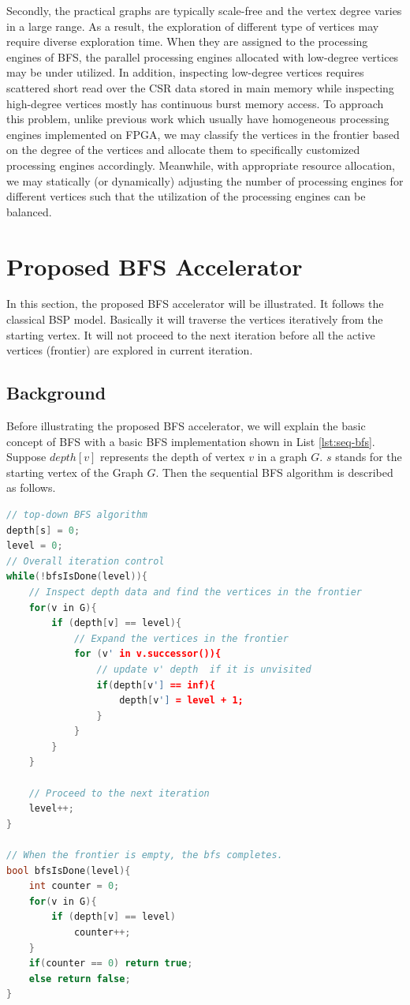 \documentclass[12pt]{article} %
\begin{document}
Secondly, the practical graphs are typically scale-free and the vertex degree 
varies in a large range. As a result, the exploration of different type of vertices 
may require diverse exploration time. When they are assigned to the processing engines of BFS, 
the parallel processing engines allocated with low-degree vertices may be under utilized. 
In addition, inspecting low-degree vertices requires scattered short read over the 
CSR data stored in main memory while inspecting high-degree vertices mostly has continuous 
burst memory access. To approach this problem, unlike previous work which usually 
have homogeneous processing engines implemented on FPGA, we may classify the vertices in 
the frontier based on the degree of the vertices and allocate them to specifically customized 
processing engines accordingly. Meanwhile, with appropriate resource allocation, we may 
statically (or dynamically) adjusting the number of processing engines for different 
vertices such that the utilization of the processing engines can be balanced.

\section{Proposed BFS Accelerator}
In this section, the proposed BFS accelerator will be illustrated. It 
follows the classical BSP model. Basically it will traverse the vertices 
iteratively from the starting vertex. It will not proceed to the next iteration 
before all the active vertices (frontier) are explored in current iteration.

\subsection{Background}
Before illustrating the proposed BFS accelerator, we will explain the basic concept 
of BFS with a basic BFS implementation shown in List \ref{lst:seq-bfs}. Suppose $depth[v]$ represents the 
depth of vertex $v$ in a graph $G$. $s$ stands for the starting vertex of the Graph $G$. 
Then the sequential BFS algorithm is described as follows. 

\begin{lstlisting}[caption={Sequential BFS Algorithm}, label={lst:seq-bfs}, language=c, showstringspaces=false]
// top-down BFS algorithm
depth[s] = 0;
level = 0;
// Overall iteration control
while(!bfsIsDone(level)){
    // Inspect depth data and find the vertices in the frontier
    for(v in G){
        if (depth[v] == level){ 
            // Expand the vertices in the frontier
            for (v' in v.successor()){
                // update v' depth  if it is unvisited
                if(depth[v'] == inf){ 
                    depth[v'] = level + 1;
                }
            }
        }
    }

    // Proceed to the next iteration
    level++;
}

// When the frontier is empty, the bfs completes.
bool bfsIsDone(level){
    int counter = 0;
    for(v in G){
        if (depth[v] == level)
            counter++;
    }
    if(counter == 0) return true;
    else return false;
}

\end{lstlisting}
\end{document}
